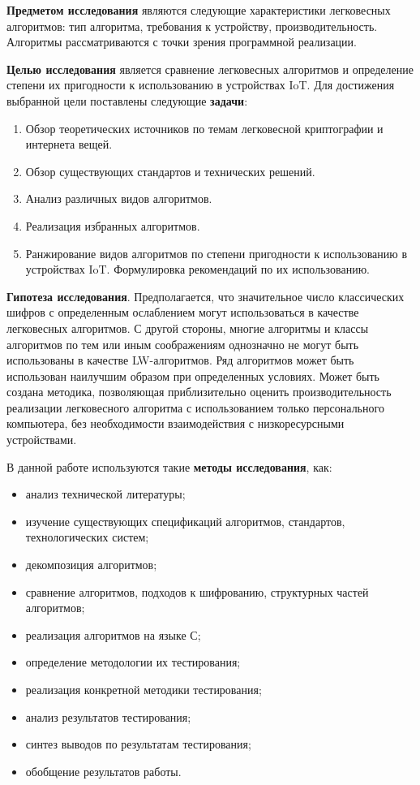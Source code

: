\textbf{Предметом исследования} являются следующие характеристики легковесных алгоритмов: тип алгоритма, требования к устройству, производительность. Алгоритмы рассматриваются с точки зрения программной реализации.

\textbf{Целью исследования} является сравнение легковесных алгоритмов и определение степени их пригодности к использованию в устройствах IoT. Для достижения выбранной цели поставлены следующие \textbf{задачи}:
\begin{enumerate}
	\item Обзор теоретических источников по темам легковесной криптографии и интернета вещей.
	\item Обзор существующих стандартов и технических решений.
	\item Анализ различных видов алгоритмов.
	\item Реализация избранных алгоритмов.
	\item Ранжирование видов алгоритмов по степени пригодности к использованию в устройствах IoT. Формулировка рекомендаций по их использованию.
\end{enumerate} 

\textbf{Гипотеза исследования}. Предполагается, что значительное число классических шифров с определенным ослаблением могут использоваться в качестве легковесных алгоритмов. С другой стороны, многие алгоритмы и классы алгоритмов по тем или иным соображениям однозначно не могут быть использованы в качестве LW-алгоритмов. Ряд алгоритмов может быть использован наилучшим образом при определенных условиях. Может быть создана методика, позволяющая приблизительно оценить производительность реализации легковесного алгоритма с использованием только персонального компьютера, без необходимости взаимодействия с низкоресурсными устройствами.

В данной работе используются такие \textbf{методы исследования}, как:
\begin{itemize}
	\item анализ технической литературы;
	\item изучение существующих спецификаций алгоритмов, стандартов, технологических систем;
	\item декомпозиция алгоритмов;
	\item сравнение алгоритмов, подходов к шифрованию, структурных частей алгоритмов;
	\item реализация алгоритмов на языке С;
	\item определение методологии их тестирования;
	\item реализация конкретной методики тестирования;
	\item анализ результатов тестирования;
	\item синтез выводов по результатам тестирования;
	\item обобщение результатов работы.
\end{itemize}  

